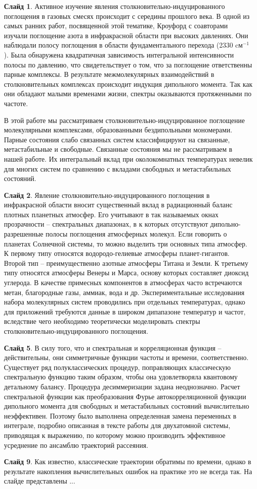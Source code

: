 \documentclass[12pt]{article}
\begin{document}
\textbf{Слайд 1}. Активное изучение явления столкновительно-индуцированного поглощения в газовых смесях происходит с середины прошлого века. В одной из самых ранних работ, посвященной этой тематике, Кроуфорд с соавторами изучали поглощение азота в инфракрасной области при высоких давлениях. Они наблюдали полосу поглощения в области фундаментального перехода (2330 cм$^{-1}$). Была обнаружена квадратичная зависимость интегральной интенсивности полосы по давлению, что свидетельствует о том, что за поглощение ответственны парные комплексы. В результате межмолекулярных взаимодействий в столкновительных комплексах происходит индукция дипольного момента. Так как они обладают малыми временами жизни, спектры оказываются протяженными по частоте. \par 
В этой работе мы рассматриваем столкновительно-индуцированное поглощение молекулярными комплексами, образованными бездипольными мономерами. Парные состояния слабо связанных систем классифицируют на связанные, метастабильные и свободные. Связанные состояния мы не рассматриваем в нашей работе. Их интегральный вклад при околокомнатных температурах невелик для многих систем по сравнению с вкладами свободных и метастабильных состояний. \par 
\textbf{Слайд 2}. Явление столкновительно-индуцированного поглощения в инфракрасной области вносит существенный вклад в радиационный баланс плотных планетных атмосфер. Его учитывают в так называемых окнах прозрачности -- спектральных диапазонах, в к которых отсутствуют дипольно-разрешенные полосы поглощения атмосферных молекул. Если говорить о планетах Солнечной системы, то можно выделить три основных типа атмосфер. К первому типу относятся водородо-гелиевые атмосферы планет-гигантов. Второй тип -- преимущественно азотные атмосферы Титана и Земли. К третьему типу относятся атмосферы Венеры и Марса, основу которых составляет диоксид углерода. В качестве примесных компонентов в атмосферах часто встречаются метан, благородные газы, аммиак, вода и др. Экспериментальные исследования набора молекулярных систем проводились при отдельных температурах, однако для приложений требуются данные в широком дипапазоне температур и частот, вследствие чего необходимо теоретически моделировать спектры столкновительно-индуцированного поглощения. \par 
\textbf{Слайд 5}. В силу того, что и спектральная и корреляционная функция -- действительны, они симметричные функции частоты и времени, соответственно. Существует ряд полуклассических процедур, поправляющих классическую спектральную функцию таким образом, чтобы она удовлетворяла квантовому детальному балансу. Процедура десиммеризации задана неоднозначно. Расчет спектральной функции как преобразования Фурье автокорреляционной функции дипольного момента для свободных и метастабильных состояний вычислительно неэффективен. Поэтому было выполнена определенная замена переменных в интеграле, подробно описанная в тексте работы для двухатомной системы, приводящая к выражению, по которому можно производить эффективное усреднение по ансамблю траекторий рассеяния. \par
\textbf{Слайд 9}. Как известно, классические траектории обратимы по времени, однако в результате накопления вычислительных ошибок на практике это не всегда так. На слайде представлены ...
\end{document}
